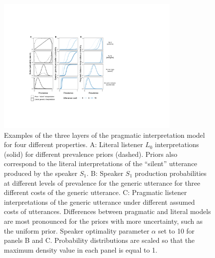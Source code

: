 \documentclass[floatsintext,doc]{apa6}
\begin{document}
\begin{figure}
\centering
\includegraphics[width=0.8\textwidth]{figs/tripartite.pdf}
\vspace{0.5cm}
\caption{Examples of the three layers of the pragmatic interpretation model for four different properties. A: Literal listener $L_0$ interpretations (solid) for different prevalence priors (dashed). Priors also correspond to the literal interpretations of the ``silent'' utterance produced by the speaker $S_1$. B: Speaker $S_1$ production probabilities at different levels of prevalence for the generic utterance for three different costs of the generic utterance. C: Pragmatic listener interpretations of the generic utterance under different assumed costs of utterances. Differences between pragmatic and literal models are most pronounced for the priors with more uncertainty, such as the uniform prior. Speaker optimality parameter $\alpha$ set to 10 for panels B and C. Probability distributions are scaled so that the maximum density value in each panel is equal to 1. }
\label{fig:tripartite}
\end{figure}
%
%
%
\end{document}
